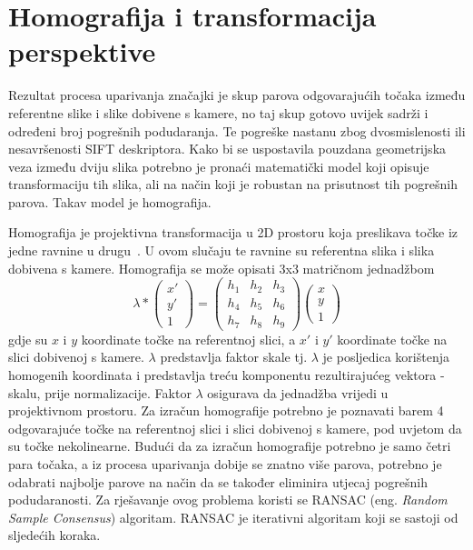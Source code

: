 \section{Homografija i transformacija perspektive}

Rezultat procesa uparivanja značajki je skup parova odgovarajućih točaka između referentne slike i slike dobivene s kamere, no taj skup gotovo uvijek sadrži i određeni broj pogrešnih podudaranja. Te pogreške nastanu zbog dvosmislenosti ili nesavršenosti SIFT deskriptora. Kako bi se uspostavila pouzdana geometrijska veza između dviju slika potrebno je pronaći matematički model koji opisuje transformaciju tih slika, ali na način koji je robustan na prisutnost tih pogrešnih parova. Takav model je homografija. 

Homografija je projektivna transformacija u 2D prostoru koja preslikava točke iz jedne ravnine u drugu~\cite{foundationsCVbook}. U ovom slučaju te ravnine su referentna slika i slika dobivena s kamere. Homografija se može opisati 3x3 matričnom jednadžbom
\begin{equation}
    \lambda *
    \begin{pmatrix}
        x' \\
        y' \\
        1
    \end{pmatrix}
    =
    \begin{pmatrix}
        h_1 & h_2 & h_3 \\
        h_4 & h_5 & h_6 \\
        h_7 & h_8 & h_9
    \end{pmatrix}
    \begin{pmatrix}
        x \\
        y \\
        1
    \end{pmatrix}
\end{equation}
gdje su $x$ i $y$ koordinate točke na referentnoj slici, a $x'$ i $y'$ koordinate točke na slici dobivenoj s kamere. $\lambda$ predstavlja faktor skale tj. $\lambda$ je posljedica korištenja homogenih koordinata i predstavlja treću komponentu rezultirajućeg vektora - skalu, prije normalizacije. Faktor $\lambda$ osigurava da jednadžba vrijedi u projektivnom prostoru. Za izračun homografije potrebno je poznavati barem 4 odgovarajuće točke na referentnoj slici i slici dobivenoj s kamere, pod uvjetom da su točke nekolinearne.
Budući da za izračun homografije potrebno je samo četri para točaka, a iz procesa uparivanja dobije se znatno više parova, potrebno je odabrati najbolje parove na način da se također eliminira utjecaj pogrešnih podudaranosti. Za rješavanje ovog problema koristi se RANSAC (eng. \textit{Random Sample Consensus}) algoritam. RANSAC je iterativni algoritam koji se sastoji od sljedećih koraka. 

